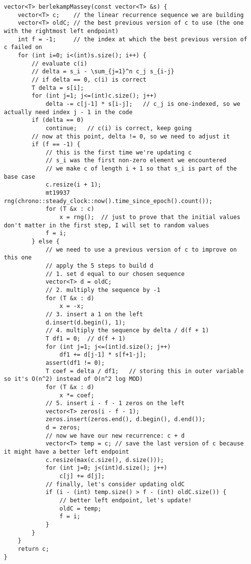 \documentclass[10pt]{article}
\begin{document}
\begin{multicols*}{2}
\begin{lstlisting}[style=compactcpp]
vector<T> berlekampMassey(const vector<T> &s) {
    vector<T> c;    // the linear recurrence sequence we are building
    vector<T> oldC; // the best previous version of c to use (the one with the rightmost left endpoint)
    int f = -1;     // the index at which the best previous version of c failed on
    for (int i=0; i<(int)s.size(); i++) {
        // evaluate c(i)
        // delta = s_i - \sum_{j=1}^n c_j s_{i-j}
        // if delta == 0, c(i) is correct
        T delta = s[i];
        for (int j=1; j<=(int)c.size(); j++)
            delta -= c[j-1] * s[i-j];   // c_j is one-indexed, so we actually need index j - 1 in the code
        if (delta == 0)
            continue;   // c(i) is correct, keep going
        // now at this point, delta != 0, so we need to adjust it
        if (f == -1) {
            // this is the first time we're updating c
            // s_i was the first non-zero element we encountered
            // we make c of length i + 1 so that s_i is part of the base case
            c.resize(i + 1);
            mt19937 rng(chrono::steady_clock::now().time_since_epoch().count());
            for (T &x : c)
                x = rng();  // just to prove that the initial values don't matter in the first step, I will set to random values
            f = i;
        } else {
            // we need to use a previous version of c to improve on this one
            // apply the 5 steps to build d
            // 1. set d equal to our chosen sequence
            vector<T> d = oldC;
            // 2. multiply the sequence by -1
            for (T &x : d)
                x = -x;
            // 3. insert a 1 on the left
            d.insert(d.begin(), 1);
            // 4. multiply the sequence by delta / d(f + 1)
            T df1 = 0;  // d(f + 1)
            for (int j=1; j<=(int)d.size(); j++)
                df1 += d[j-1] * s[f+1-j];
            assert(df1 != 0);
            T coef = delta / df1;   // storing this in outer variable so it's O(n^2) instead of O(n^2 log MOD)
            for (T &x : d)
                x *= coef;
            // 5. insert i - f - 1 zeros on the left
            vector<T> zeros(i - f - 1);
            zeros.insert(zeros.end(), d.begin(), d.end());
            d = zeros;
            // now we have our new recurrence: c + d
            vector<T> temp = c; // save the last version of c because it might have a better left endpoint
            c.resize(max(c.size(), d.size()));
            for (int j=0; j<(int)d.size(); j++)
                c[j] += d[j];
            // finally, let's consider updating oldC
            if (i - (int) temp.size() > f - (int) oldC.size()) {
                // better left endpoint, let's update!
                oldC = temp;
                f = i;
            }
        }
    }
    return c;
}
\end{lstlisting}


\end{multicols*}
\end{document}
